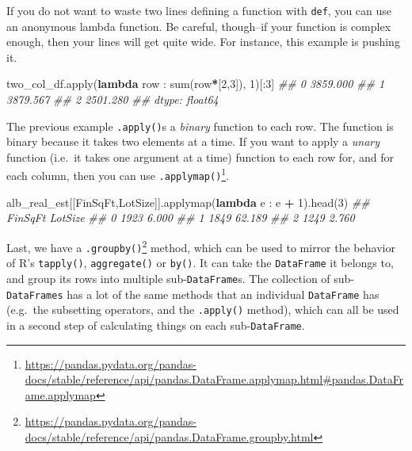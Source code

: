 \documentclass[
  12pt,
  krantz2]{krantz}
\makeatletter
\newenvironment{Shaded}{\begin{snugshade}}{\end{snugshade}}
\newcommand{\BuiltInTok}[1]{#1}
\newcommand{\CommentTok}[1]{\textcolor[rgb]{0.37,0.37,0.37}{\textit{#1}}}
\newcommand{\DecValTok}[1]{\textcolor[rgb]{0.06,0.06,0.06}{#1}}
\newcommand{\KeywordTok}[1]{\textcolor[rgb]{0.27,0.27,0.27}{\textbf{#1}}}
\newcommand{\NormalTok}[1]{#1}
\newcommand{\OperatorTok}[1]{\textcolor[rgb]{0.43,0.43,0.43}{\textbf{#1}}}
\newcommand{\StringTok}[1]{\textcolor[rgb]{0.5,0.5,0.5}{#1}}
\renewcommand{\href}[2]{#2\footnote{\url{#1}}}
\newenvironment{kframe}{%
\medskip{}
\setlength{\fboxsep}{.8em}
 \def\at@end@of@kframe{}%
 \ifinner\ifhmode%
  \def\at@end@of@kframe{\end{minipage}}%
  \begin{minipage}{\columnwidth}%
 \fi\fi%
 \def\FrameCommand##1{\hskip\@totalleftmargin \hskip-\fboxsep
 \colorbox{shadecolor}{##1}\hskip-\fboxsep
     \hskip-\linewidth \hskip-\@totalleftmargin \hskip\columnwidth}%
 \MakeFramed {\advance\hsize-\width
   \@totalleftmargin\z@ \linewidth\hsize
   \@setminipage}}%
 {\par\unskip\endMakeFramed%
 \at@end@of@kframe}
\renewenvironment{Shaded}{\begin{kframe}}{\end{kframe}}
\makeatother
\begin{document}
If you do not want to waste two lines defining a function with \texttt{def}, you can use an anonymous lambda function. Be careful, though--if your function is complex enough, then your lines will get quite wide. For instance, this example is pushing it.

\begin{Shaded}
\begin{Highlighting}[]
\NormalTok{two\_col\_df.}\BuiltInTok{apply}\NormalTok{(}\KeywordTok{lambda}\NormalTok{ row : }\BuiltInTok{sum}\NormalTok{(row}\OperatorTok{*}\NormalTok{[}\DecValTok{2}\NormalTok{,}\DecValTok{3}\NormalTok{]), }\DecValTok{1}\NormalTok{)[:}\DecValTok{3}\NormalTok{]}
\CommentTok{\#\# 0    3859.000}
\CommentTok{\#\# 1    3879.567}
\CommentTok{\#\# 2    2501.280}
\CommentTok{\#\# dtype: float64}
\end{Highlighting}
\end{Shaded}

The previous example \texttt{.apply()}s a \emph{binary} function to each row. The function is binary because it takes two elements at a time. If you want to apply a \emph{unary} function (i.e.~it takes one argument at a time) function to each row for, and for each column, then you can use \href{https://pandas.pydata.org/pandas-docs/stable/reference/api/pandas.DataFrame.applymap.html\#pandas.DataFrame.applymap}{\texttt{.applymap()}}.

\begin{Shaded}
\begin{Highlighting}[]
\NormalTok{alb\_real\_est[[}\StringTok{\textquotesingle{}FinSqFt\textquotesingle{}}\NormalTok{,}\StringTok{\textquotesingle{}LotSize\textquotesingle{}}\NormalTok{]].applymap(}\KeywordTok{lambda}\NormalTok{ e : e }\OperatorTok{+} \DecValTok{1}\NormalTok{).head(}\DecValTok{3}\NormalTok{)}
\CommentTok{\#\#    FinSqFt  LotSize}
\CommentTok{\#\# 0     1923    6.000}
\CommentTok{\#\# 1     1849   62.189}
\CommentTok{\#\# 2     1249    2.760}
\end{Highlighting}
\end{Shaded}

Last, we have a \href{https://pandas.pydata.org/pandas-docs/stable/reference/api/pandas.DataFrame.groupby.html}{\texttt{.groupby()}} method, which can be used to mirror the behavior of R's \texttt{tapply()}, \texttt{aggregate()} or \texttt{by()}. It can take the \texttt{DataFrame} it belongs to, and group its rows into multiple sub-\texttt{DataFrame}s. The collection of sub-\texttt{DataFrames} has a lot of the same methods that an individual \texttt{DataFrame} has (e.g.~the subsetting operators, and the \texttt{.apply()} method), which can all be used in a second step of calculating things on each sub-\texttt{DataFrame}.
\end{document}

